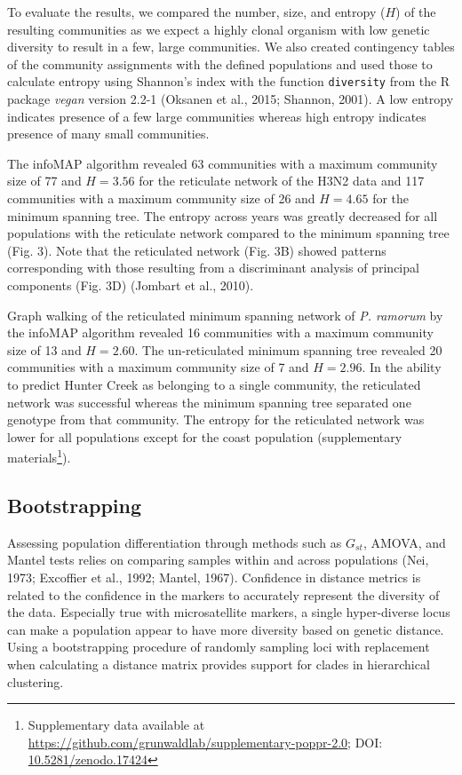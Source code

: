 \documentclass{frontiersSCNS} %
\begin{document}
To evaluate the results, we compared the number, size, and entropy
(\(H\)) of the resulting communities as we expect a highly clonal
organism with low genetic diversity to result in a few, large
communities. We also created contingency tables of the community
assignments with the defined populations and used those to calculate
entropy using Shannon's index with the function \texttt{diversity} from
the R package \emph{vegan} version 2.2-1 (Oksanen et al., 2015; Shannon,
2001). A low entropy indicates presence of a few large communities
whereas high entropy indicates presence of many small communities.

The infoMAP algorithm revealed 63 communities with a maximum community
size of 77 and \(H = 3.56\) for the reticulate network of the H3N2 data
and 117 communities with a maximum community size of 26 and \(H = 4.65\)
for the minimum spanning tree. The entropy across years was greatly
decreased for all populations with the reticulate network compared to
the minimum spanning tree (Fig. 3). Note that the reticulated network
(Fig. 3B) showed patterns corresponding with those resulting from a
discriminant analysis of principal components (Fig. 3D) (Jombart et al.,
2010).

Graph walking of the reticulated minimum spanning network of \emph{P.
ramorum} by the infoMAP algorithm revealed 16 communities with a maximum
community size of 13 and \(H = 2.60\). The un-reticulated minimum
spanning tree revealed 20 communities with a maximum community size of 7
and \(H = 2.96\). In the ability to predict Hunter Creek as belonging to
a single community, the reticulated network was successful whereas the
minimum spanning tree separated one genotype from that community. The
entropy for the reticulated network was lower for all populations except
for the coast population (supplementary materials\footnote{Supplementary
  data available at
  \url{https://github.com/grunwaldlab/supplementary-poppr-2.0}; DOI:
  \href{http://dx.doi.org/10.5281/zenodo.17424}{10.5281/zenodo.17424}}).

\subsection*{Bootstrapping}\label{bootstrapping}

Assessing population differentiation through methods such as \(G_{st}\),
AMOVA, and Mantel tests relies on comparing samples within and across
populations (Nei, 1973; Excoffier et al., 1992; Mantel, 1967).
Confidence in distance metrics is related to the confidence in the
markers to accurately represent the diversity of the data. Especially
true with microsatellite markers, a single hyper-diverse locus can make
a population appear to have more diversity based on genetic distance.
Using a bootstrapping procedure of randomly sampling loci with
replacement when calculating a distance matrix provides support for
clades in hierarchical clustering.
\end{document}
